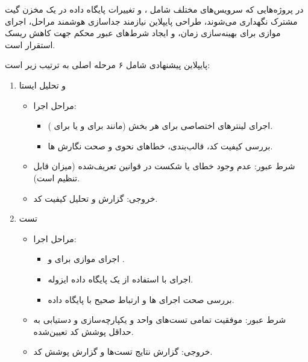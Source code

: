 در پروژه‌هایی که سرویس‌های مختلف شامل ،  و تغییرات پایگاه داده در یک مخزن گیت مشترک نگهداری می‌شوند، طراحی پایپلاین  نیازمند جداسازی هوشمند مراحل، اجرای موازی برای بهینه‌سازی زمان، و ایجاد شرط‌های عبور محکم جهت کاهش ریسک استقرار است.


پایپلاین پیشنهادی شامل ۶ مرحله اصلی به ترتیب زیر است:

\begin{enumerate}[label=\arabic*.]

    \item { و تحلیل ایستا}
    \begin{itemize}
        \item {مراحل اجرا:}
        \begin{itemize}
            \item اجرای لینترهای اختصاصی برای هر بخش (مانند  برای  و  یا  برای ).
            \item بررسی کیفیت کد، قالب‌بندی، خطاهای نحوی و صحت نگارش ها.
        \end{itemize}

        \item {شرط عبور:}
        عدم وجود خطای  یا شکست در قوانین تعریف‌شده (میزان  قابل تنظیم است).

        \item {خروجی:}
        گزارش  و تحلیل کیفیت کد.
    \end{itemize}

    \item {تست}
    \begin{itemize}
        \item {مراحل اجرا:}
        \begin{itemize}
            \item اجرای موازی  برای  و .
            \item اجرای  با استفاده از یک پایگاه داده ایزوله.
            \item بررسی صحت اجرای ها و ارتباط صحیح  با پایگاه داده.
        \end{itemize}

        \item {شرط عبور:}
        موفقیت تمامی تست‌های واحد و یکپارچه‌سازی و دستیابی به حداقل پوشش کد تعیین‌شده.

        \item {خروجی:}
        گزارش نتایج تست‌ها و گزارش پوشش کد.
    \end{itemize}


\end{enumerate}
